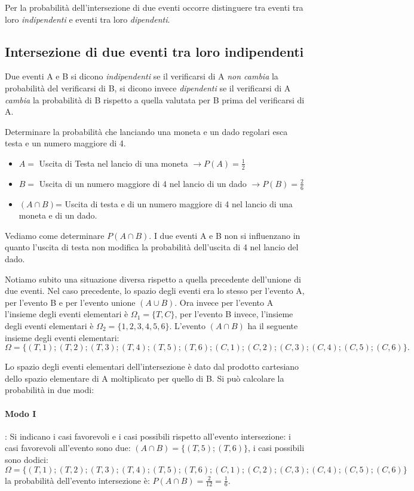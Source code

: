 Per la probabilità dell'intersezione di due eventi occorre distinguere tra 
eventi tra loro \emph{indipendenti} e eventi tra loro \emph{dipendenti}.

\subsection{Intersezione di due eventi tra loro indipendenti}

Due eventi A e B si dicono \emph{indipendenti} se il verificarsi di A \emph{non 
cambia} la probabilità del verificarsi di B, si dicono invece \emph{dipendenti} 
se il verificarsi di A \emph{cambia} la probabilità di B rispetto a quella 
valutata per B prima del verificarsi di A.
\newpage
\begin{exrig}
\begin{esempio}
Determinare la probabilità che lanciando una moneta e un dado regolari esca 
testa e un numero maggiore di 4.
\begin{itemize}
\item $ A = $ Uscita di Testa nel lancio di una moneta $\to P(A)=\frac 1 2$
\item $ B = $ Uscita di un numero maggiore di 4 nel lancio di un dado $\to 
P(B)=\frac 2 6$
\item $(A\cap B)$= Uscita di testa e di un numero maggiore di 4 nel lancio di 
una moneta e di un dado.
\end{itemize}
Vediamo come determinare $P(A\cap B)$.
I due eventi A e B non si influenzano in quanto l'uscita di testa non modifica 
la probabilità dell'uscita di 4 nel lancio del dado.

Notiamo subito una situazione diversa rispetto a quella precedente dell'unione 
di due eventi. Nel caso precedente, lo spazio degli eventi era lo stesso per 
l'evento A, per l'evento B e per l'evento unione $(A\cup B)$.
Ora invece per l'evento A l'insieme degli eventi elementari è $\Omega 
_1=\{T,C\}$, per l'evento B invece, l'insieme degli eventi elementari è $\Omega 
_2=\{1,2,3,4,5,6\}$. L'evento $(A\cap B)$ ha il seguente insieme degli eventi 
elementari: \[ \Omega 
=\{(T,1);(T,2);(T,3);(T,4);(T,5);(T,6);(C,1);(C,2);(C,3);(C,4);(C,5);(C,6)\}. \]

Lo spazio degli eventi elementari dell'intersezione è dato dal prodotto 
cartesiano dello spazio elementare di A moltiplicato per quello di B. Si può 
calcolare la probabilità in due modi:
\paragraph{Modo I}: Si indicano i casi favorevoli e i casi possibili rispetto 
all'evento intersezione: i casi favorevoli all'evento sono due: $(A\cap 
B)=\{(T,5);(T,6)\}$, i casi possibili sono dodici: \[\Omega 
=\{(T,1);(T,2);(T,3);(T,4);(T,5);(T,6);(C,1);(C,2);(C,3);(C,4);(C,5);(C,6)\} \] 
la probabilità dell'evento intersezione è: $P(A\cap B)=\frac 2{12}=\frac 1 6$.


\end{esempio}
\end{exrig}
